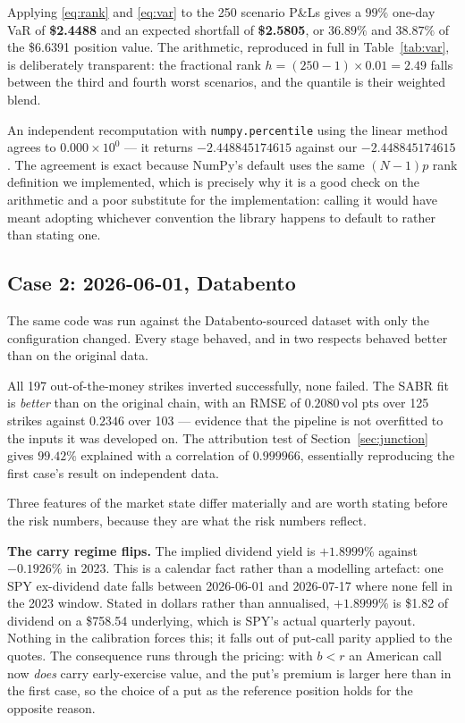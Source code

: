 \documentclass[11pt]{article}
\newcommand{\vp}{\,\text{vol pts}}
\begin{document}
Applying \eqref{eq:rank} and \eqref{eq:var} to the 250 scenario P\&Ls gives a $99\%$
one-day VaR of \textbf{\$2.4488} and an expected shortfall of \textbf{\$2.5805}, or
$36.89\%$ and $38.87\%$ of the \$6.6391 position value. The arithmetic, reproduced in
full in Table~\ref{tab:var}, is deliberately transparent: the fractional rank
$h=(250-1)\times0.01=2.49$ falls between the third and fourth worst scenarios, and the
quantile is their weighted blend.

An independent recomputation with \texttt{numpy.percentile} using the linear method
agrees to $0.000\times10^{0}$ --- it returns $-2.448845174615$ against our
$-2.448845174615$. The agreement is exact because NumPy's default uses the same
$(N-1)p$ rank definition we implemented, which is precisely why it is a good check on the
arithmetic and a poor substitute for the implementation: calling it would have meant
adopting whichever convention the library happens to default to rather than stating one.

\subsection{Case 2: 2026-06-01, Databento}
\label{sec:case2}

The same code was run against the Databento-sourced dataset with only the configuration
changed. Every stage behaved, and in two respects behaved better than on the original
data.

All 197 out-of-the-money strikes inverted successfully, none failed. The SABR fit is
\emph{better} than on the original chain, with an RMSE of $0.2080\vp$ over 125 strikes
against $0.2346$ over 103 --- evidence that the pipeline is not overfitted to the inputs
it was developed on. The attribution test of Section~\ref{sec:junction} gives $99.42\%$
explained with a correlation of $0.999966$, essentially reproducing the first case's
result on independent data.

Three features of the market state differ materially and are worth stating before the
risk numbers, because they are what the risk numbers reflect.

\textbf{The carry regime flips.} The implied dividend yield is $+1.8999\%$ against
$-0.1926\%$ in 2023. This is a calendar fact rather than a modelling artefact: one SPY
ex-dividend date falls between 2026-06-01 and 2026-07-17 where none fell in the 2023
window. Stated in dollars rather than annualised, $+1.8999\%$ is \$1.82 of dividend on a
\$758.54 underlying, which is SPY's actual quarterly payout. Nothing in the calibration
forces this; it falls out of put-call parity applied to the quotes. The consequence runs
through the pricing: with $b<r$ an American call now \emph{does} carry early-exercise
value, and the put's premium is larger here than in the first case, so the choice of a
put as the reference position holds for the opposite reason.
\end{document}
